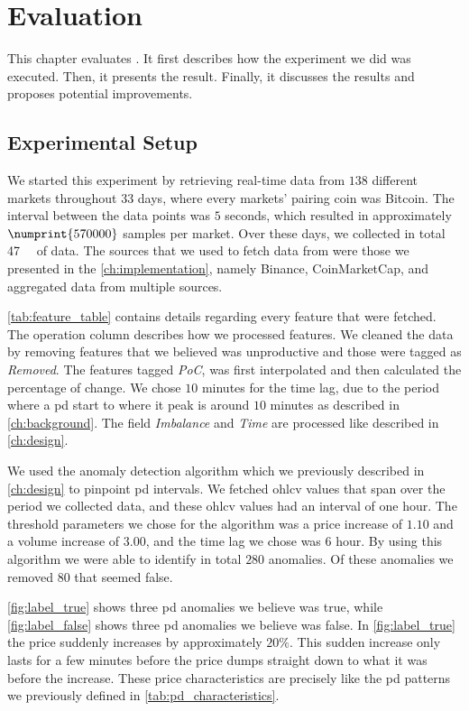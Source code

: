 \chapter{Evaluation}\label{ch:evaluation}\glsresetall
This chapter evaluates \project. It first describes how the experiment we did was executed. Then, it presents the result. Finally, it discusses the results and proposes potential improvements.

\section{Experimental Setup}\label{sec:experimental_setup}
We started this experiment by retrieving real-time data from $138$ different markets throughout $33$ days, where every markets' pairing coin was Bitcoin. The interval between the data points was $5$ seconds, which resulted in approximately $\numprint{570 000}$ samples per market. Over these days, we collected in total \SI{47}{\giga\byte} of data. The sources that we used to fetch data from were those we presented in the \autoref{ch:implementation}, namely Binance, CoinMarketCap, and aggregated data from multiple sources. 

\autoref{tab:feature_table} contains details regarding every feature that were fetched. The operation column describes how we processed features. We cleaned the data by removing features that we believed was unproductive and those were tagged as \emph{Removed}. The features tagged \emph{PoC}, was first interpolated and then calculated the percentage of change. We chose $10$ minutes for the time lag, due to the period where a \ac{pd} start to where it peak is around $10$ minutes as described in \autoref{ch:background}. The field \emph{Imbalance} and \emph{Time} are processed like described in \autoref{ch:design}.



We used the anomaly detection algorithm which we previously described in \autoref{ch:design} to pinpoint \ac{pd} intervals. We fetched \ac{ohlcv} values that span over the period we collected data, and these \ac{ohlcv} values had an interval of one hour. The threshold parameters we chose for the algorithm was a price increase of $1.10$ and a volume increase of $3.00$, and the time lag we chose was $6$ hour. By using this algorithm we were able to identify in total $280$ anomalies. Of these anomalies we removed $80$ that seemed false.

\autoref{fig:label_true} shows three \ac{pd} anomalies we believe was true, while \autoref{fig:label_false} shows three \ac{pd} anomalies we believe was false. In \autoref{fig:label_true} the price suddenly increases by approximately $20\%$. This sudden increase only lasts for a few minutes before the price dumps straight down to what it was before the increase. These price characteristics are precisely like the \ac{pd} patterns we previously defined in \autoref{tab:pd_characteristics}. 

